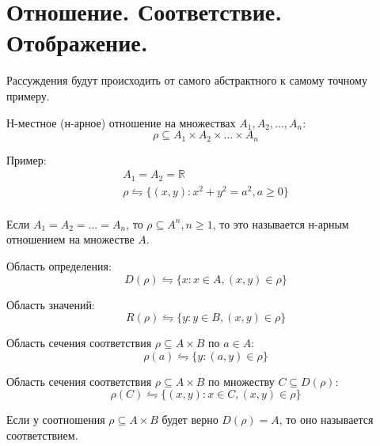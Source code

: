 

\title{}
\author{Козырнов Александр Дмитриевич, ИУ7-32Б}
\date{\today}


\section{Отношение. Соответствие. Отображение.}
Рассуждения будут происходить от самого абстрактного к самому точному примеру.

\begin{definition}
Н-местное (н-арное) отношение на множествах $A_1,A_2,\ldots,A_{n}$: \[
\rho \subseteq A_1\times A_2\times \ldots\times A_n
\] 
\end{definition}

Пример:
\begin{gather*}
	A_1=A_2=\mathbb{R} \\
	\rho \leftrightharpoons \{(x,y): x^2+y^2=a^2, a\ge 0\} \\
\end{gather*}

\medskip

\begin{definition}
Если $A_1=A_2=\ldots=A_n$, то $\rho \subseteq A^{n}, n\ge 1$, то это называется
н-арным отношением на множестве $A$.
\end{definition}

\begin{definition}
Область определения: \[
D(\rho) \leftrightharpoons \{x: x \in A, (x,y) \in \rho\} 
\] 
\end{definition}

\begin{definition}
Область значений:
\[
R(\rho) \leftrightharpoons \{y: y \in B, (x,y) \in \rho\} 
\] 
\end{definition}

\begin{definition}
Область сечения соответствия $\rho \subseteq A\times B$ по $a \in A$: \[
\rho(a) \leftrightharpoons \{y: (a,y) \in \rho\} 
\] 
\end{definition}

\begin{definition}
Область сечения соответствия $\rho \subseteq A\times B$ по множеству $C\subseteq D(\rho)$:
 \[
\rho(C) \leftrightharpoons \{(x,y): x \in C, (x,y) \in \rho\} 
\] 
\end{definition}

\begin{definition}
Если у соотношения $\rho \subseteq A\times B$ будет верно $D(\rho) = A$, то оно называется
соответствием.
\end{definition}

